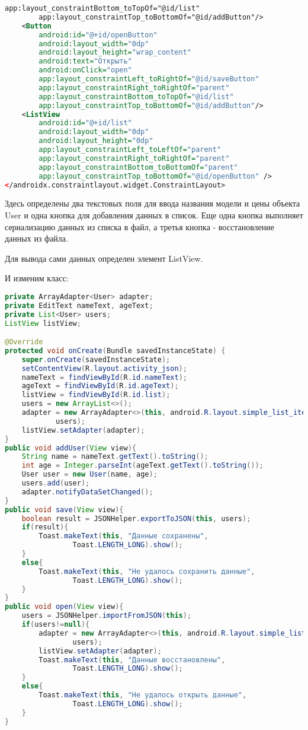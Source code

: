 \begin{lstlisting}[language=XML
	, label=lst:
	]
        app:layout_constraintBottom_toTopOf="@id/list"
        app:layout_constraintTop_toBottomOf="@id/addButton"/>
    <Button
        android:id="@+id/openButton"
        android:layout_width="0dp"
        android:layout_height="wrap_content"
        android:text="Открыть"
        android:onClick="open"
        app:layout_constraintLeft_toRightOf="@id/saveButton"
        app:layout_constraintRight_toRightOf="parent"
        app:layout_constraintBottom_toTopOf="@id/list"
        app:layout_constraintTop_toBottomOf="@id/addButton"/>
    <ListView
        android:id="@+id/list"
        android:layout_width="0dp"
        android:layout_height="0dp"
        app:layout_constraintLeft_toLeftOf="parent"
        app:layout_constraintRight_toRightOf="parent"
        app:layout_constraintBottom_toBottomOf="parent"
        app:layout_constraintTop_toBottomOf="@id/openButton" />
</androidx.constraintlayout.widget.ConstraintLayout>
\end{lstlisting}

Здесь определены два текстовых поля для ввода названия модели и цены
объекта User и одна кнопка для добавления данных в список. Еще одна
кнопка выполняет сериализацию данных из списка в файл, а третья кнопка -
восстановление данных из файла.\par
Для вывода сами данных определен элемент ListView.\par
И изменим класс:

\begin{lstlisting}[language=Java
	, label=lst:
	]
private ArrayAdapter<User> adapter;
private EditText nameText, ageText;
private List<User> users;
ListView listView;

@Override
protected void onCreate(Bundle savedInstanceState) {
	super.onCreate(savedInstanceState);
	setContentView(R.layout.activity_json);
	nameText = findViewById(R.id.nameText);
	ageText = findViewById(R.id.ageText);
	listView = findViewById(R.id.list);
	users = new ArrayList<>();
	adapter = new ArrayAdapter<>(this, android.R.layout.simple_list_item_1,
			users);
	listView.setAdapter(adapter);
}
public void addUser(View view){
	String name = nameText.getText().toString();
	int age = Integer.parseInt(ageText.getText().toString());
	User user = new User(name, age);
	users.add(user);
	adapter.notifyDataSetChanged();
}
public void save(View view){
	boolean result = JSONHelper.exportToJSON(this, users);
	if(result){
		Toast.makeText(this, "Данные сохранены",
				Toast.LENGTH_LONG).show();
	}
	else{
		Toast.makeText(this, "Не удалось сохранить данные",
				Toast.LENGTH_LONG).show();
	}
}
public void open(View view){
	users = JSONHelper.importFromJSON(this);
	if(users!=null){
		adapter = new ArrayAdapter<>(this, android.R.layout.simple_list_item_1,
				users);
		listView.setAdapter(adapter);
		Toast.makeText(this, "Данные восстановлены",
				Toast.LENGTH_LONG).show();
	}
	else{
		Toast.makeText(this, "Не удалось открыть данные",
				Toast.LENGTH_LONG).show();
	}
}
\end{lstlisting}

